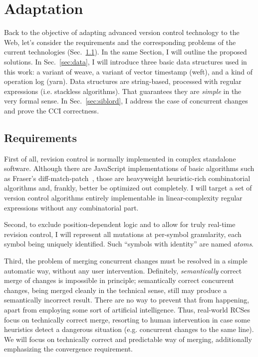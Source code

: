 \documentclass{sig-alternate}
\begin{document}
\section {Adaptation}   \label{sec:textile}

Back to the objective of adapting advanced version control technology to the Web, let's consider the requirements and the corresponding problems of the current technologies (Sec.~\ref{sec:req}). 
In the same Section, I will outline the proposed solutions.
In Sec.~\ref{sec:data}, I will introduce three basic data structures used in this work: a variant of weave, a variant of vector timestamp (weft), and a kind of operation log (yarn). Data structures are string-based, processed with regular expressions (i.e. stackless algorithms). That guarantees they are \emph{simple} in the very formal sense.
In Sec.~\ref{sec:siblord}, I address the case of concurrent changes and prove the CCI correctness.

\subsection {Requirements} \label{sec:req}
First of all, revision control is normally implemented in complex standalone software.
Although there are JavaScript implementations of basic algorithms such as Fraser's diff-match-patch~\cite{diff-match-patch}, those are heavyweight heuristic-rich combinatorial algorithms and, frankly, better be optimized out completely.
I will target a set of version control algorithms entirely implementable in linear-complexity regular expressions without any combinatorial part.

Second, to exclude position-dependent logic and to allow for truly real-time revision control, I will represent all mutations at per-symbol granularity, each symbol being uniquely identified.
Such ``symbols with identity'' are named \emph{atoms}.

Third, the problem of merging concurrent changes must be resolved in a simple automatic way, without any user intervention.
Definitely, \emph{semantically} correct merge of changes is impossible in principle; semantically correct concurrent changes, being merged cleanly in the technical sense, still may produce a semantically incorrect result.
There are no way to prevent that from happening, apart from employing some sort of artificial intelligence.
Thus, real-world RCSes focus on technically correct merge, resorting to human intervention in case some heuristics detect a dangerous situation (e.g. concurrent changes to the same line).
We will focus on technically correct and predictable way of merging, additionally emphasizing the convergence requirement.
\end{document}

